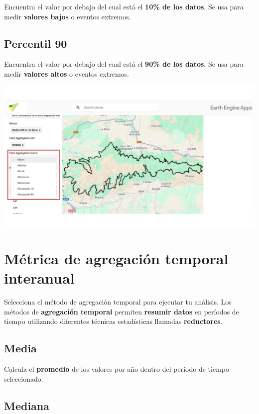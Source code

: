 \documentclass[
]{book}
\begin{document}
Encuentra el valor por debajo del cual está el \textbf{10\% de los datos}. Se usa para medir \textbf{valores bajos} o eventos extremos.

\section{\texorpdfstring{\textbf{Percentil 90}}{Percentil 90}}\label{percentil-90}

Encuentra el valor por debajo del cual está el \textbf{90\% de los datos}. Se usa para medir \textbf{valores altos} o eventos extremos.

\includegraphics{assets/aggregationTime.png}

\chapter{Métrica de agregación temporal interanual}\label{agregacion-temporal-interanual}

Selecciona el método de agregación temporal para ejecutar tu análisis. Los métodos de \textbf{agregación temporal} permiten \textbf{resumir datos} en períodos de tiempo utilizando diferentes técnicas estadísticas llamadas \textbf{reductores}.

\section{\texorpdfstring{\textbf{Media}}{Media}}\label{media-1}

Calcula el \textbf{promedio} de los valores por año dentro del periodo de tiempo seleccionado.

\section{\texorpdfstring{\textbf{Mediana}}{Mediana}}\label{mediana-1}
\end{document}
